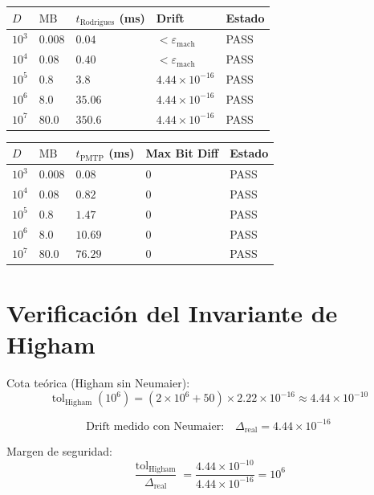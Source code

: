 \begin{tabular}{llll}
\hline
$D$ & $\text{MB}$ & $t_{\text{Rodrigues}}$ (ms) & Drift & Estado \\
\hline
$10^3$ & $0.008$ & $0.04$ & $< \varepsilon_{\text{mach}}$ & PASS \\
$10^4$ & $0.08$ & $0.40$ & $< \varepsilon_{\text{mach}}$ & PASS \\
$10^5$ & $0.8$ & $3.8$ & $4.44 \times 10^{-16}$ & PASS \\
$10^6$ & $8.0$ & $35.06$ & $4.44 \times 10^{-16}$ & PASS \\
$10^7$ & $80.0$ & $350.6$ & $4.44 \times 10^{-16}$ & PASS \\
\hline


\end{tabular}

\begin{tabular}{llll}
\hline
$D$ & $\text{MB}$ & $t_{\text{PMTP}}$ (ms) & Max Bit Diff & Estado \\
\hline
$10^3$ & $0.008$ & $0.08$ & $0$ & PASS \\
$10^4$ & $0.08$ & $0.82$ & $0$ & PASS \\
$10^5$ & $0.8$ & $1.47$ & $0$ & PASS \\
$10^6$ & $8.0$ & $10.69$ & $0$ & PASS \\
$10^7$ & $80.0$ & $76.29$ & $0$ & PASS \\
\hline


\end{tabular}

\section{Verificación del Invariante de Higham}

Cota teórica (Higham sin Neumaier):
\begin{equation}
\operatorname{tol}_{\text{Higham}}(10^6) = (2 \times 10^6 + 50) \times 2.22 \times 10^{-16} \approx 4.44 \times 10^{-10}
\end{equation}

\begin{equation}
\text{Drift medido con Neumaier:} \quad \Delta_{\text{real}} = 4.44 \times 10^{-16}
\end{equation}

Margen de seguridad:
\begin{equation}
\frac{\operatorname{tol}_{\text{Higham}}}{\Delta_{\text{real}}} = \frac{4.44 \times 10^{-10}}{4.44 \times 10^{-16}} = 10^6
\end{equation}

